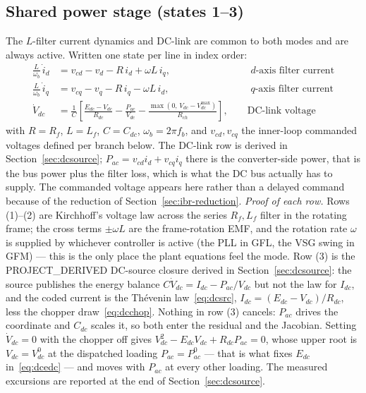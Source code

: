 \documentclass[12pt,a4paper]{article}
\theoremstyle{remark}
\begin{document}
\subsection{Shared power stage (states 1--3)}
The $L$-filter current dynamics and DC-link are common to both modes and are
always active. Written one state per line in index order:
\begin{align}
  \tfrac{L}{\omega_b}\,\dot{i}_d &= v_{cd}-v_d-R\,i_d+\omega L\,i_q,
    &&\text{ $d$-axis filter current}\\
  \tfrac{L}{\omega_b}\,\dot{i}_q &= v_{cq}-v_q-R\,i_q-\omega L\,i_d,
    &&\text{ $q$-axis filter current}\\
  \dot{V}_{dc} &= \tfrac{1}{C}\!\left[\tfrac{E_{dc}-V_{dc}}{R_{dc}}
      -\frac{P_{ac}}{V_{dc}}
      -\frac{\max(0,\,V_{dc}-V_{dc}^{\max})}{R_{ch}}\right],
    &&\text{ DC-link voltage}
\end{align}
with $R=R_f$, $L=L_f$, $C=C_{dc}$, $\omega_b=2\pi f_b$, and $v_{cd},v_{cq}$ the
inner-loop commanded voltages defined per branch below. The DC-link row is
derived in Section~\ref{sec:dcsource}; $P_{ac}=v_{cd}i_d+v_{cq}i_q$ there is the
converter-side power, that is the bus power plus the filter loss, which is what
the DC bus actually has to supply. The commanded voltage
appears here rather than a delayed command because of the reduction of
Section~\ref{sec:ibr-reduction}. \emph{Proof of each row.}
Rows (1)--(2) are Kirchhoff's voltage law across the series $R_f,L_f$ filter in
the rotating frame; the cross terms $\pm\omega L$ are the frame-rotation EMF, and
the rotation rate $\omega$ is supplied by whichever controller is active (the PLL
in GFL, the VSG swing in GFM) --- this is the only place the plant equations feel
the mode. Row (3) is the \textsf{PROJECT\_DERIVED} DC-source closure derived in
Section~\ref{sec:dcsource}: the source publishes the energy balance
$C\dot V_{dc}=I_{dc}-P_{ac}/V_{dc}$ but not the law for $I_{dc}$, and the coded
current is the Th\'evenin law~\eqref{eq:dcsrc}, $I_{dc}=(E_{dc}-V_{dc})/R_{dc}$,
less the chopper draw~\eqref{eq:dcchop}. Nothing in row (3) cancels: $P_{ac}$
drives the coordinate and $C_{dc}$ scales it, so both enter the residual and the
Jacobian. Setting $\dot V_{dc}=0$ with the chopper off gives
$V_{dc}^{2}-E_{dc}V_{dc}+R_{dc}P_{ac}=0$, whose upper root is $V_{dc}=V_{dc}^{0}$
at the dispatched loading $P_{ac}=P_{ac}^{0}$ --- that is what fixes $E_{dc}$
in~\eqref{eq:dcedc} --- and moves with $P_{ac}$ at every other loading. The
measured excursions are reported at the end of Section~\ref{sec:dcsource}.
\end{document}
